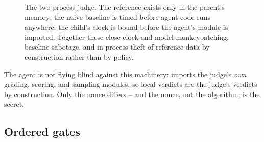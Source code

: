 \documentclass[11pt]{article}
\newcommand{\pc}[1]{\texttt{\detokenize{#1}}}
\begin{document}
\begin{figure}[t]
\caption{The two-process judge. The reference exists only in the parent's memory; the
naive baseline is timed before agent code runs anywhere; the child's clock is bound
before the agent's module is imported. Together these close clock and model
monkeypatching, baseline sabotage, and in-process theft of reference data by
construction rather than by policy.}
\label{fig:arch}
\end{figure}

The agent is not flying blind against this machinery: \pc{env/local_check.py} imports
the judge's \emph{own} grading, scoring, and sampling modules, so local verdicts are
the judge's verdicts by construction. Only the nonce differs -- and the nonce, not the
algorithm, is the secret.

\subsection{Ordered gates}
\label{sec:gates}
\end{document}
